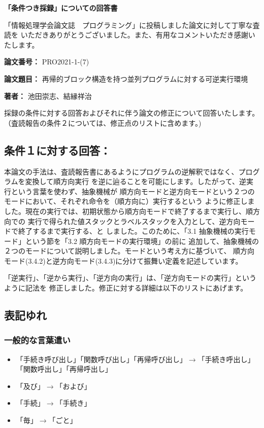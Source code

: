 \documentclass[a4j]{jarticle}
\begin{document}
\begin{center}
{\bf\Large
「条件つき採録」についての回答書
}
\end{center}

「情報処理学会論文誌　プログラミング」に投稿しました論文に対して丁寧な査読を
いただきありがとうございました。また、有用なコメントいただき感謝いたします。

\begin{list}{}{}
\item [{\bf 論文番号：}] PRO2021-1-(7)
\item [{\bf 論文題目：}] 再帰的ブロック構造を持つ並列プログラムに対する可逆実行環境
\item [{\bf 著者：}] 池田崇志、結縁祥治
\end{list}

採録の条件に対する回答およびそれに伴う論文の修正について回答いたします。
（査読報告の条件２については、修正点のリストに含めます。)

\subsection*{条件１に対する回答：}
本論文の手法は、査読報告書にあるようにプログラムの逆解釈ではなく、プログラムを変換して順方向実行
を逆に辿ることを可能にします。したがって、逆実行という言葉を使わず、抽象機械が
順方向モードと逆方向モードという２つのモードにおいて、それぞれ命令を（順方向に）実行するという
ように修正しました。現在の実行では、初期状態から順方向モードで終了するまで実行し、順方向での
実行で得られた値スタックとラベルスタックを入力として、逆方向モードで終了するまで実行する、と
しました。このために、「3.1 抽象機械の実行モード」という節を「3.2 順方向モードの実行環境」の前に
追加して、抽象機械の２つのモードについて説明しました。モードという考え方に基づいて、
順方向モード(3.4.2)と逆方向モード(3.4.3)に分けて振舞い定義を記述しています。

「逆実行」、「逆から実行」、「逆方向の実行」は、「逆方向モードの実行」というように記法を
修正しました。修正に対する詳細は以下のリストにあげます。

\subsection*{表記ゆれ}

\subsubsection*{一般的な言葉遣い}
\begin{itemize}
\item 「手続き呼び出し」「関数呼び出し」「再帰呼び出し」$\rightarrow$「手続き呼出し」「関数呼出し」「再帰呼出し」
\item 「及び」$\rightarrow$「および」
\item 「手続」$\rightarrow$「手続き」
\item 「毎」$\rightarrow$「ごと」
\end{itemize}
\end{document}
